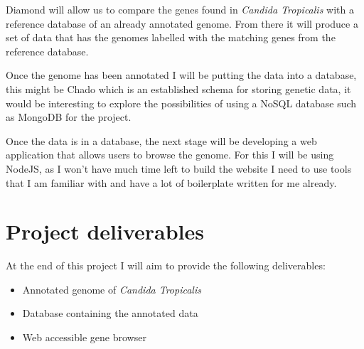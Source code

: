 \documentclass[11pt,fleqn,twoside]{article}
\begin{document}
Diamond will allow us to compare the genes found in \textit{Candida Tropicalis} with a reference database of an already annotated genome. From there it will produce a set of data that has the genomes labelled with the matching genes from the reference database.

Once the genome has been annotated I will be putting the data into a database, this might be Chado\cite{chado} which is an established schema for storing genetic data, it would be interesting to explore the possibilities of using a NoSQL database such as MongoDB for the project. 

Once the data is in a database, the next stage will be developing a web application that allows users to browse the genome. For this I will be using NodeJS, as I won't have much time left to build the website I need to use tools that I am familiar with and have a lot of boilerplate written for me already. 


\section{Project deliverables}
At the end of this project I will aim to provide the following deliverables:

\begin{itemize}
  \item Annotated genome of \textit{Candida Tropicalis}
  \item Database containing the annotated data
  \item Web accessible gene browser
\end{itemize}

%
%
%


\nocite{*} %

\newpage
{}
%
%

\renewcommand{\refname}{Annotated Bibliography}  %
\end{document}
